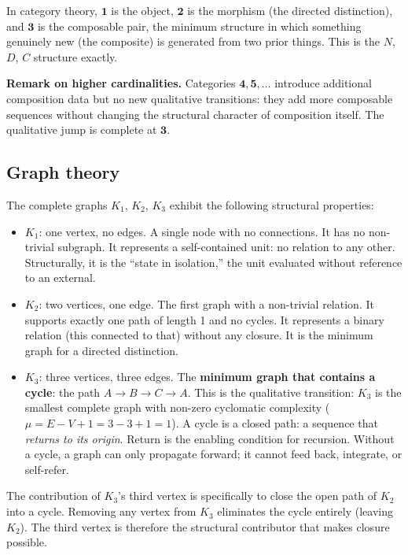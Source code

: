 \documentclass[12pt]{article}
\begin{document}
In category theory, \(\mathbf{1}\) is the object, \(\mathbf{2}\) is the
morphism (the directed distinction), and \(\mathbf{3}\) is the
composable pair, the minimum structure in which something genuinely new
(the composite) is generated from two prior things. This is the \(N\),
\(D\), \(C\) structure exactly.

\textbf{Remark on higher cardinalities.} Categories
\(\mathbf{4}, \mathbf{5}, \ldots\) introduce additional composition data
but no new qualitative transitions: they add more composable sequences
without changing the structural character of composition itself. The
qualitative jump is complete at \(\mathbf{3}\).

\subsection{Graph theory}\label{graph-theory}

The complete graphs \(K_1\), \(K_2\), \(K_3\) exhibit the following
structural properties:

\begin{itemize}
\item
  \(K_1\): one vertex, no edges. A single node with no connections. It
  has no non-trivial subgraph. It represents a self-contained unit: no
  relation to any other. Structurally, it is the ``state in isolation,''
  the unit evaluated without reference to an external.
\item
  \(K_2\): two vertices, one edge. The first graph with a non-trivial
  relation. It supports exactly one path of length 1 and no cycles. It
  represents a binary relation (this connected to that) without any
  closure. It is the minimum graph for a directed distinction.
\item
  \(K_3\): three vertices, three edges. The \textbf{minimum graph that
  contains a cycle}: the path \(A \to B \to C \to A\). This is the
  qualitative transition: \(K_3\) is the smallest complete graph with
  non-zero cyclomatic complexity (\(\mu = E - V + 1 = 3 - 3 + 1 = 1\)).
  A cycle is a closed path: a sequence that \emph{returns to its
  origin}. Return is the enabling condition for recursion. Without a
  cycle, a graph can only propagate forward; it cannot feed back,
  integrate, or self-refer.
\end{itemize}

The contribution of \(K_3\)'s third vertex is specifically to close the
open path of \(K_2\) into a cycle. Removing any vertex from \(K_3\)
eliminates the cycle entirely (leaving \(K_2\)). The third vertex is
therefore the structural contributor that makes closure possible.
\end{document}
